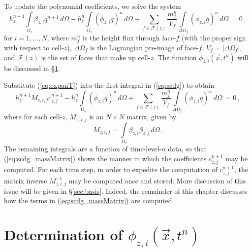 \documentclass[11pt]{report}
\newcommand{\svec}[1]{{\Vec{#1}}}
\begin{document}
To update the polynomial coefficients, we solve the system
\begin{equation}
  \label{eq:scdg}
  h_z^{n+1} \int\limits_{\Omega_z} \beta_{z,i} q^{n+1} \, d\Omega - 
  h_z^{n}   \int\limits_{\Omega_z} (\phi_{z,i} q)^{n}   \, d\Omega +
  \sum_{f\in\mathcal{F}(z)}
     \frac{m_f^n}{V_f} \int\limits_{\Delta\Omega_{f}}
  (\phi_{z,i} q)^n \, d\Omega\ = 0\,,
\end{equation}
for $i = 1, \ldots, N$, where $m_f^n$ is the height flux through face-$f$ (with the proper sign with
respect to cell-$z$), $\Delta\Omega_{f}$ is the Lagrangian pre-image of
face-$f$, $V_f = |\Delta\Omega_{f}|$, and $\mathcal{F}(z)$ is the set of
faces that make up cell-$z$.  The function $\phi_{z,i}(\svec{x},t^n)$ will be
discussed in \S\ref{sec:phi}.

Substitute (\ref{eq:expanT}) into the first integral in (\ref{eq:scdg}) to
obtain
\begin{equation}
  \label{eq:scdg_massMatrix}
  h_z^{n+1} M_{z,i,j} c^{n+1}_{z,j} - 
  h_z^{n}   \int\limits_{\Omega_z} (\phi_{z,i} q)^{n}   \, d\Omega +
  \sum_{f\in\mathcal{F}(z)}
     \frac{m_f^n}{V_f} \int\limits_{\Delta\Omega_{f}}
  (\phi_{z,i} q)^n \, d\Omega\ = 0\,,
\end{equation}
where for each cell-$z$, $M_{z,i,j}$ is an $N \times N$ matrix, given by
\begin{equation}
  \label{eq:massMatrix}
  M_{z,i,j} = \int\limits_{\Omega_z} \beta_{z,i} \beta_{z,j} \, d\Omega\,.
\end{equation}
The remaining integrals are a function of time-level-$n$ data, so that
(\ref{eq:scdg_massMatrix}) shows the manner in which the coefficients
$c^{n+1}_{z,j}$ may be computed.  For each time step, in order to expedite the
computation of $c^{n+1}_{z,j}$, the matrix inverse $M^{-1}_{z,i,j}$ may be
computed once and stored.  More discussion of this issue will be given in
\S\ref{sec:basis}.  Indeed, the remainder of this chapter discusses how the
terms in (\ref{eq:scdg_massMatrix}) are computed.

\section{Determination of $\phi_{z,i}(\svec{x},t^n)$}
\label{sec:phi}
\end{document}
